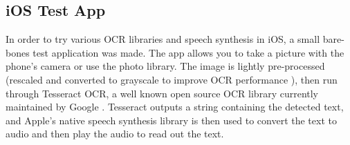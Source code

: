 \documentclass[a4paper,11pt]{article}
\begin{document}
\newpage
\subsection{iOS Test App}
In order to try various OCR libraries and speech synthesis in iOS, a small bare-bones test application was made. The app allows you to take a picture with the phone's camera or use the photo library. The image is lightly pre-processed (rescaled and converted to grayscale to improve OCR performance \cite{tesseract-improve-quality}), then run through Tesseract OCR, a well known open source OCR library currently maintained by Google \cite{tesseract-github}. Tesseract outputs a string containing the detected text, and Apple's native speech synthesis library \cite{apple-speech-synthesis} is then used to convert the text to audio and then play the audio to read out the text.

\
\end{document}
